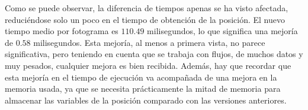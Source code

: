 {\begin{table}[h]
	\centering
	\caption{Tabla con los tiempos de la ejecución con la versión reducida de la posición.}
	\label{tab:tiempos2}
\end{table}

Como se puede observar, la diferencia de tiempos apenas se ha visto afectada, reduciéndose solo un poco en el tiempo de obtención de la posición. El nuevo tiempo medio por fotograma es $110.49$ milisegundos, lo que significa una mejoría de $0.58$ milisegundos. Esta mejoría, al menos a primera vista, no parece significativa, pero teniendo en cuenta que se trabaja con flujos, de muchos datos y muy pesados, cualquier mejora es bien recibida. Además, hay que recordar que esta mejoría en el tiempo de ejecución va acompañada de una mejora en la memoria usada, ya que se necesita prácticamente la mitad de memoria para almacenar las variables de la posición comparado con las versiones anteriores. 

}
